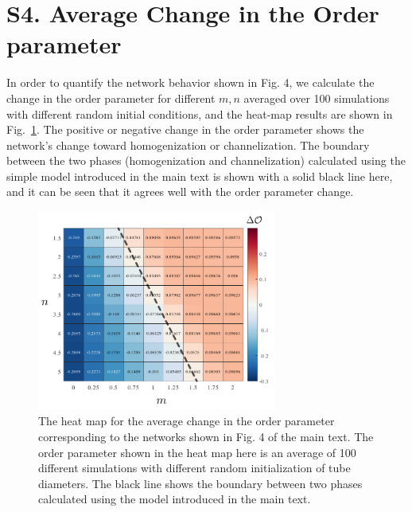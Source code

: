 \documentclass[%
reprint,
 amsmath,amssymb,
 aps,
prl,
]{revtex4-1}
\begin{document}
\section{S4. Average Change in the  Order parameter}
\label{s4}
%
In order to quantify the network behavior shown in Fig. 4, we calculate the change in the order parameter for different $m,n$ averaged over 100 simulations with different random initial conditions, and the heat-map results are shown in Fig.~\ref{fig:fig4_SI-2}. The positive or negative change in the order parameter shows the network's change toward homogenization or channelization. The boundary between the two phases (homogenization and channelization) calculated using the simple model introduced in the main text is shown with a solid black line here, and it can be seen that it agrees well with the order parameter change. 
%
\begin{figure}[htp]
    \includegraphics[width = 0.70\textwidth]{FigS5.pdf}
    \caption{The heat map for the average change in the order parameter corresponding to the networks shown in Fig. 4 of the main text. The order parameter shown in the heat map here is an average of 100 different simulations with different random initialization of tube diameters. The black line shows the boundary between two phases calculated using the model introduced in the main text.}\label{fig:fig4_SI-2}
\end{figure}
\end{document}
